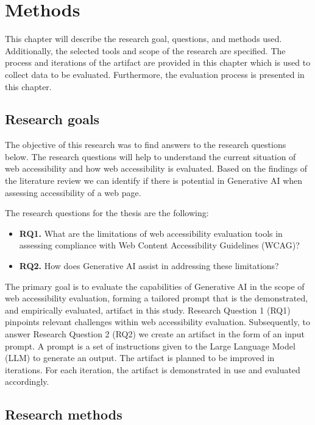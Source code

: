 \chapter{Methods\label{methods}}

This chapter will describe the research goal, questions, and methods used. Additionally, the selected tools and scope of the research are specified. The process and iterations of the artifact are provided in this chapter which is used to collect data to be evaluated. Furthermore, the evaluation process is presented in this chapter.

\section{Research goals}

The objective of this research was to find answers to the research questions below. The research questions will help to understand the current situation of web accessibility and how web accessibility is evaluated. Based on the findings of the literature review we can identify if there is potential in Generative AI when assessing accessibility of a web page. 

The research questions for the thesis are the following:

\begin{itemize}
    \item \textbf{RQ1.} What are the limitations of web accessibility evaluation tools in assessing compliance with Web Content Accessibility Guidelines (WCAG)?
    \item \textbf{RQ2.} How does Generative AI assist in addressing these limitations?
\end{itemize}

The primary goal is to evaluate the capabilities of Generative AI in the scope of web accessibility evaluation, forming a tailored prompt that is the demonstrated, and empirically evaluated, artifact in this study. Research Question 1 (RQ1) pinpoints relevant challenges within web accessibility evaluation. Subsequently, to answer Research Question 2 (RQ2) we create an artifact in the form of an input prompt. A prompt is a set of instructions given to the Large Language Model (LLM) to generate an output. The artifact is planned to be improved in iterations. For each iteration, the artifact is demonstrated in use and evaluated accordingly.

\section{Research methods}

